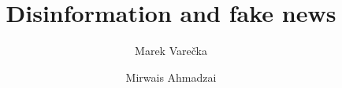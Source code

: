 \documentclass[12pt, letterpaper]{article}
\begin{document}
\title{Disinformation and fake news}

\author{Marek Varečka}
\author{Mirwais Ahmadzai}
\end{document}
